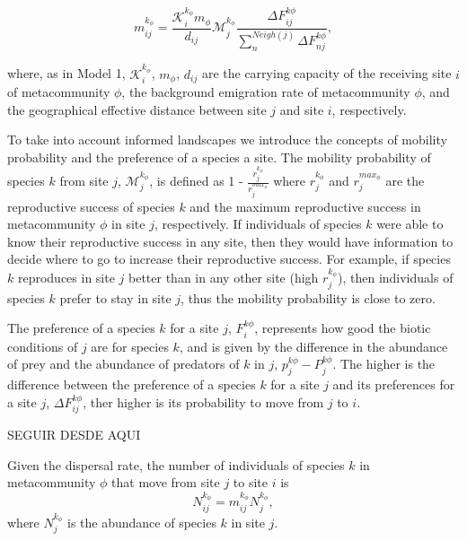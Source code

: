 
\begin{equation}
  m^{k_{\phi}}_{ij} = \frac{\mathcal{K}^{k_{\phi}}_{i} m_{\phi}}{d_{ij}} \mathcal{M}^{k_{\phi}}_{j} \frac{\Delta F^{k\phi}_{ij}}{\sum_{n}^{Neigh(j)}\Delta F^{k\phi}_{nj}},
\end{equation}


where, as in Model 1, $\mathcal{K}^{k_{\phi}}_{i}$, $m_{\phi}$, $d_{ij}$ are
the carrying capacity of the receiving site $i$ of metacommunity $\phi$, the
background emigration rate of metacommunity $\phi$, and the geographical
effective distance between site $j$ and site $i$, respectively. 

To take into account informed landscapes we introduce the concepts of mobility
probability and the preference of a species a site. The mobility probability of
species $k$ from site $j$, $\mathcal{M}^{k_{\phi}}_{j}$, is defined as 1 -
$\frac{r^{k_{\phi}}_{j}}{r^{max_{\phi}}_{j}}$ where $r^{k_{\phi}}_{j}$ and
$r^{max_{\phi}}_{j}$ are the reproductive success of species $k$ and the
maximum reproductive success in metacommunity $\phi$ in site $j$, respectively.
If individuals of species $k$ were able to know their reproductive success in
any site, then they would have information to decide where to go to increase
their reproductive success. For example, if species $k$ reproduces in site $j$
better than in any other site (high $r^{k_{\phi}}_{j}$), then individuals of
species $k$ prefer to stay in site $j$, thus the mobility probability is close
to zero.

The preference of a species $k$ for a site $j$, $F^{k\phi}_{i}$, represents how
good the biotic conditions of $j$ are for species $k$, and is given by the
difference in the abundance of prey and the abundance of predators of $k$ in
$j$, $p^{k\phi}_{j}
- P^{k\phi}_{j}$.  The higher is the difference between the preference of a
  species $k$ for a site $j$ and its preferences for a site $j$, $\Delta
F^{k\phi}_{ij}$, ther higher is its probability to move from $j$ to $i$. 

SEGUIR DESDE AQUI

Given the dispersal rate, the number of individuals of species $k$ in
metacommunity $\phi$ that move from site $j$ to site $i$ is
\begin{equation}
  N^{k_{\phi}}_{ij} =  m^{k_{\phi}}_{ij}  N^{k_{\phi}}_{j},
\end{equation}
where $N^{k_{\phi}}_{j}$ is the abundance of species $k$ in site $j$.


